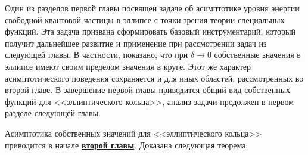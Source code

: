 Один из разделов первой главы посвящен задаче об асимптотике уровня энергии свободной квантовой частицы в эллипсе с точки зрения теории специальных функций. Эта задача призвана сформировать базовый инструментарий, который получит дальнейшее развитие и применение при рассмотрении задач из следующей главы. В частности, показано, что при $\delta \to0$ собственные значения в эллипсе имеют своим пределом значения в круге. Этот же характер асимптотического поведения сохраняется и для иных областей, рассмотренных во второй главе.
В завершение первой главы приводится общий вид собственных функций для <<эллиптического кольца>>, анализ задачи продолжен в первом разделе следующей главы.

Асимптотика собственных значений для <<эллиптического кольца>> приводится в начале \underline{\textbf{второй главы}}. 
Доказана следующая теорема:
